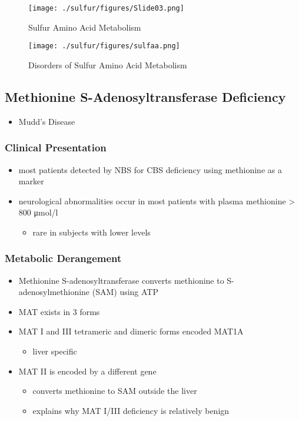 \documentclass{scrartcl}
\begin{document}
\begin{figure}[htbp]
\centering
\texttt{[image: ./sulfur/figures/Slide03.png]}
\caption{\label{fig:orgafacaa6}
Sulfur Amino Acid Metabolism}
\end{figure}

\begin{figure}[htbp]
\centering
\texttt{[image: ./sulfur/figures/sulfaa.png]}
\caption{\label{fig:org5e29b5c}
Disorders of Sulfur Amino Acid Metabolism}
\end{figure}

\subsection{Methionine S-Adenosyltransferase Deficiency}
\label{sec:org65f0d4b}
\begin{itemize}
\item Mudd’s Disease
\end{itemize}
\subsubsection{Clinical Presentation}
\label{sec:orga47f29e}
\begin{itemize}
\item most patients detected by NBS for CBS deficiency using methionine as a marker
\item neurological abnormalities occur in most patients with plasma methionine \textgreater{} 800 μmol/l
\begin{itemize}
\item rare in subjects with lower levels
\end{itemize}
\end{itemize}
\subsubsection{Metabolic Derangement}
\label{sec:org35ce4c7}
\begin{itemize}
\item Methionine S-adenosyltransferase converts methionine to S-adenosylmethionine (SAM) using ATP
\item MAT exists in 3 forms
\item MAT I and III tetrameric and dimeric forms encoded MAT1A 
\begin{itemize}
\item liver specific
\end{itemize}
\item MAT II is encoded by a different gene
\begin{itemize}
\item converts methionine to SAM outside the liver
\item explains why MAT I/III deficiency is relatively benign
\end{itemize}
\end{itemize}
\end{document}
